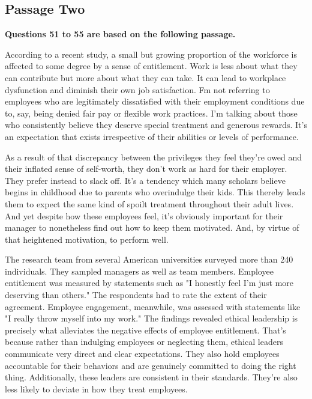 \documentclass[UTF8,11pt]{ctexart}
\begin{document}
\subsection*{\textbf{Passage Two}}


\textbf{Questions 51 to 55 are based on the following passage.}


According to a recent study, a small but growing proportion of the workforce is affected to some degree by a sense of entitlement. Work is less about what they can contribute but more about what they can take. It can lead to workplace dysfunction and diminish their own job satisfaction. Fm not referring to employees who are legitimately dissatisfied with their employment conditions due to, say, being denied fair pay or flexible work practices. I'm talking about those who consistently believe they deserve special treatment and generous rewards. It's an expectation that exists irrespective of their abilities or levels of performance.


As a result of that discrepancy between the privileges they feel they're owed and their inflated sense of self-worth, they don't work as hard for their employer. They prefer instead to slack off. It's a tendency which many scholars believe begins in childhood due to parents who overindulge their kids. This thereby leads them to expect the same kind of spoilt treatment throughout their adult lives. And yet despite how these employees feel, it's obviously important for their manager to nonetheless find out how to keep them motivated. And, by virtue of that heightened motivation, to perform well.


The research team from several American universities surveyed more than 240 individuals. They sampled managers as well as team members. Employee entitlement was measured by statements such as "I honestly feel I'm just more deserving than others." The respondents had to rate the extent of their agreement. Employee engagement, meanwhile, was assessed with statements like "I really throw myself into my work." The findings revealed ethical leadership is precisely what alleviates the negative effects of employee entitlement. That's because rather than indulging employees or neglecting them, ethical leaders communicate very direct and clear expectations. They also hold employees accountable for their behaviors and are genuinely committed to doing the right thing. Additionally, these leaders are consistent in their standards. They're also less likely to deviate in how they treat employees.
\end{document}
